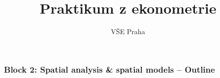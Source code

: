 \documentclass{beamer}
\title[Block 2]{Praktikum z ekonometrie} %
\author{VŠE Praha} %
\institute[4EK417] %
{
\medskip
\textit{Tomáš Formánek} %
}
\date{} %
\begin{document}
\begin{frame}
\titlepage %
\end{frame}
\begin{frame}
\frametitle{Block 2: Spatial analysis \& spatial models -- Outline} %
\tableofcontents %
\end{frame}
\end{document}
